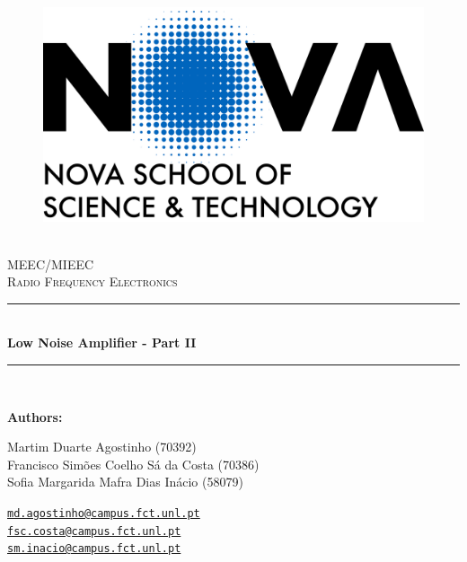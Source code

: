 \documentclass[12pt]{article}
\newcommand{\HRule}{\rule{\linewidth}{0.5mm}} %
\begin{document}

\begin{center}
    \begin{figure}
        \vspace{-1.0cm}
        \includegraphics[scale = 0.055, left]{Images/NovaFctVer.png} %
    \end{figure}

    \mbox{}\\[2.0cm]
    \textsc{\Huge MEEC/MIEEC}\\[2.5cm]
    \textsc{\LARGE Radio Frequency Electronics}\\[2.0cm]
    \HRule\\[0.4cm]
    {\large \bf {Low Noise Amplifier - Part II}}\\[0.2cm]
    \HRule\\[1.5cm]
\end{center}

\begin{flushleft}
    \textbf{Authors:}
\end{flushleft}

\begin{center}
    \begin{minipage}{0.5\textwidth}
        \begin{flushleft}
            Martim Duarte Agostinho (70392)\\
            Francisco Simões Coelho Sá da Costa   (70386)\\
            Sofia Margarida Mafra Dias Inácio (58079)\\
        \end{flushleft}
    \end{minipage}%
    \begin{minipage}{0.5\textwidth}
        \begin{flushright}
            \href{mailto:md.agostinho@campus.fct.unl.pt}{\texttt{md.agostinho@campus.fct.unl.pt}}\\
            \href{mailto:fsc.costa@campus.fct.unl.pt}{\texttt{fsc.costa@campus.fct.unl.pt}}\\
            \href{mailto:sm.inacio@campus.fct.unl.pt}{\texttt{sm.inacio@campus.fct.unl.pt}}
        \end{flushright}
    \end{minipage}
\end{center}
 
\end{document}
